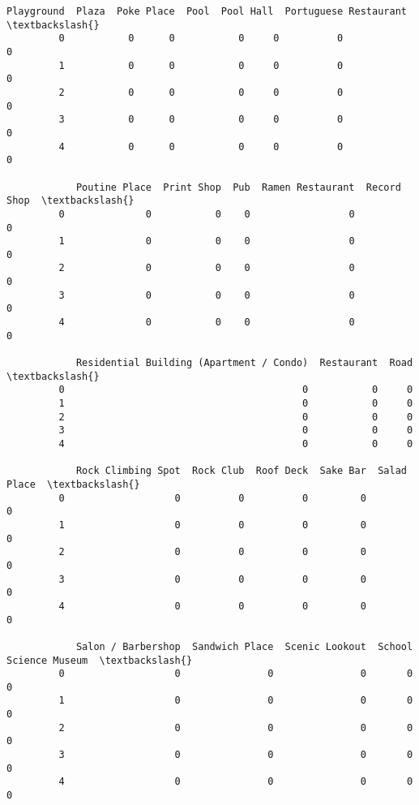 \documentclass[11pt]{article}
\begin{document}
\begin{Verbatim}[commandchars=\\\{\}]
            Playground  Plaza  Poke Place  Pool  Pool Hall  Portuguese Restaurant  \textbackslash{}
         0           0      0           0     0          0                      0   
         1           0      0           0     0          0                      0   
         2           0      0           0     0          0                      0   
         3           0      0           0     0          0                      0   
         4           0      0           0     0          0                      0   
         
            Poutine Place  Print Shop  Pub  Ramen Restaurant  Record Shop  \textbackslash{}
         0              0           0    0                 0            0   
         1              0           0    0                 0            0   
         2              0           0    0                 0            0   
         3              0           0    0                 0            0   
         4              0           0    0                 0            0   
         
            Residential Building (Apartment / Condo)  Restaurant  Road  \textbackslash{}
         0                                         0           0     0   
         1                                         0           0     0   
         2                                         0           0     0   
         3                                         0           0     0   
         4                                         0           0     0   
         
            Rock Climbing Spot  Rock Club  Roof Deck  Sake Bar  Salad Place  \textbackslash{}
         0                   0          0          0         0            0   
         1                   0          0          0         0            0   
         2                   0          0          0         0            0   
         3                   0          0          0         0            0   
         4                   0          0          0         0            0   
         
            Salon / Barbershop  Sandwich Place  Scenic Lookout  School  Science Museum  \textbackslash{}
         0                   0               0               0       0               0   
         1                   0               0               0       0               0   
         2                   0               0               0       0               0   
         3                   0               0               0       0               0   
         4                   0               0               0       0               0   
         

\end{Verbatim}
\end{document}
